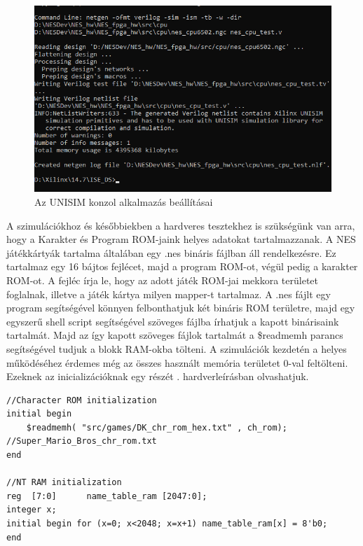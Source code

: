 \begin{figure}[H]
	\centering
	\includegraphics[width=120mm, keepaspectratio]{figures/UNISIM}
	\caption{Az UNISIM konzol alkalmazás beállításai} 
	\label{fig:UNISIM}
\end{figure}

A szimulációkhoz és későbbiekben a hardveres tesztekhez is szükségünk van arra, hogy a Karakter és Program ROM-jaink helyes adatokat tartalmazzanak. A NES játékkártyák tartalma általában egy .nes bináris fájlban áll rendelkezésre. Ez tartalmaz egy 16 bájtos fejlécet, majd a program ROM-ot, végül pedig a karakter ROM-ot. A fejléc írja le, hogy az adott játék ROM-jai mekkora területet foglalnak, illetve a játék kártya milyen mapper-t tartalmaz. A .nes fájlt egy program segítségével könnyen felbonthatjuk két bináris ROM területre, majd egy egyszerű shell script segítségével szöveges fájlba írhatjuk a kapott binárisaink tartalmát. Majd az így kapott szöveges fájlok tartalmát a \$readmemh parancs segítségével tudjuk a blokk RAM-okba tölteni. A szimulációk kezdetén a helyes működéséhez érdemes még az összes használt memória területet 0-val feltölteni. Ezeknek az inicializációknak egy részét . hardverleírásban olvashatjuk.

\begin{lstlisting}[caption={A memória területek inicializálása a szimulációs és hardveres tesztekhez}, label={code:filling-RAM}, style=prettyverilog]
//Character ROM initialization 
initial begin
	$readmemh( "src/games/DK_chr_rom_hex.txt" , ch_rom); //Super_Mario_Bros_chr_rom.txt
end

//NT RAM initialization 
reg  [7:0] 		name_table_ram [2047:0];
integer x;
initial begin for (x=0; x<2048; x=x+1) name_table_ram[x] = 8'b0;
end\end{lstlisting}

